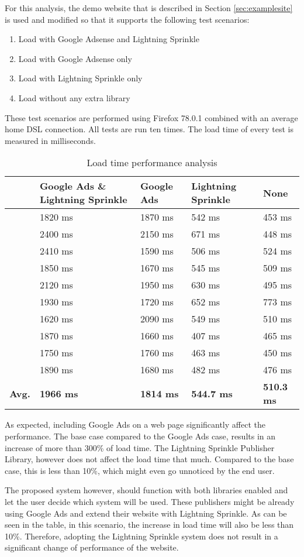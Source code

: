 For this analysis, the demo website that is described in Section \ref{sec:examplesite} is used and modified so that it supports the following test scenarios:

\begin{enumerate}
  \item Load with Google Adsense and Lightning Sprinkle
  \item Load with Google Adsense only
  \item Load with Lightning Sprinkle only
  \item Load without any extra library
\end{enumerate}

\newpage
These test scenarios are performed using Firefox 78.0.1 combined with an average home DSL connection. All tests are run ten times. The load time of every test is measured in milliseconds.

\begin{table}[h!]
  \begin{tabular}{lllll}
  & Google Ads \& Lightning Sprinkle & Google Ads & Lightning Sprinkle & None \\
  \hline
  & 1820 ms & 1870 ms & 542 ms & 453 ms \\
  & 2400 ms & 2150 ms & 671 ms & 448 ms  \\
  & 2410 ms & 1590 ms & 506 ms & 524 ms  \\
  & 1850 ms & 1670 ms & 545 ms & 509 ms  \\
  & 2120 ms & 1950 ms & 630 ms & 495 ms  \\
  & 1930 ms & 1720 ms & 652 ms & 773 ms  \\
  & 1620 ms & 2090 ms & 549 ms & 510 ms  \\
  & 1870 ms & 1660 ms & 407 ms & 465 ms  \\
  & 1750 ms & 1760 ms & 463 ms & 450 ms  \\
  & 1890 ms & 1680 ms & 482 ms & 476 ms  \\
  \hline
  \textbf{Avg.} & \textbf{1966 ms} & \textbf{1814 ms} & \textbf{544.7 ms} & \textbf{510.3 ms}
  \end{tabular}
  \caption{Load time performance analysis}
\end{table}

As expected, including Google Ads on a web page significantly affect the performance. The base case compared to the Google Ads case, results in an increase of more than 300\% of load time. The Lightning Sprinkle Publisher Library, however does not affect the load time that much. Compared to the base case, this is less than 10\%, which might even go unnoticed by the end user. 

The proposed system however, should function with both libraries enabled and let the user decide which system will be used. These publishers might be already using Google Ads and extend their website with Lightning Sprinkle. As can be seen in the table, in this scenario, the increase in load time will also be less than 10\%. Therefore, adopting the Lightning Sprinkle system does not result in a significant change of performance of the website.